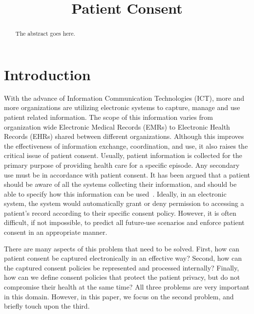 \documentclass[conference]{IEEEtran}
\begin{document}
\title{Patient Consent}

\author{
}

\maketitle


\begin{abstract}
The abstract goes here.
\end{abstract}



\section{Introduction}
With the advance of Information Communication Technologies (ICT), more and more organizations are utilizing electronic systems to capture, manage and use patient related information.  The scope of this information varies from organization wide Electronic Medical Records (EMRs) to Electronic Health Records (EHRs) shared between different organizations.  Although this improves the effectiveness of information exchange, coordination, and use, it also raises the critical issue of patient consent. Usually, patient information is collected for the primary purpose of providing health care for a specific episode. Any secondary use must be in accordance with patient consent.  It has been argued that a patient should be aware of all the systems collecting their information, and should be able to specify how this information can be used~\cite{kluge2004informed}. Ideally, in an electronic system, the system would automatically grant or deny permission to accessing a patient's record according to their specific consent policy. However, it is often difficult, if not impossible, to predict all future-use scenarios and enforce patient consent in an appropriate manner.

There are many aspects of this problem that need to be solved. First, how can patient consent be captured electronically in an effective way? Second, how can the captured consent policies be represented and processed internally? Finally, how can we define consent policies that protect the patient privacy, but do not compromise their health at the same time? All three problems are very important in this domain. However, in this paper, we focus on the second problem, and briefly touch upon the third.
\end{document}
